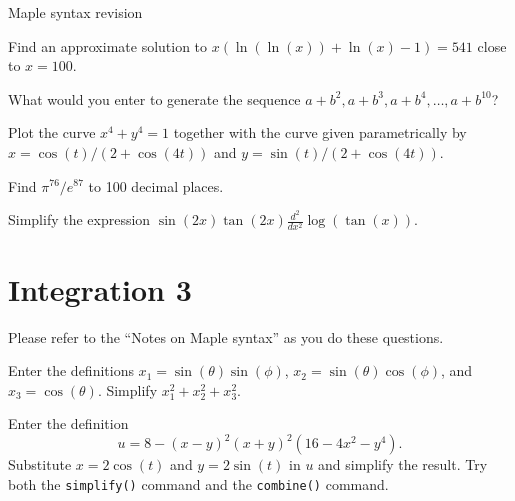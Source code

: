 \documentclass[a4paper,10pt]{amsbook}
\begin{document}
\begin{center}
 {\huge Maple syntax revision}
\end{center}

\begin{exercise}
 Find an approximate solution to
 $x(\ln(\ln(x))+\ln(x)-1)=541$ close to $x=100$. 
\end{exercise}

\begin{exercise}
 What would you enter to generate the sequence
 $a+b^2,a+b^3,a+b^4,\dotsc,a+b^{10}$? 
\end{exercise}


\begin{exercise}
 Plot the curve $x^4+y^4=1$ together with the curve given
 parametrically by $x=\cos(t)/(2+\cos(4t))$ and
 $y=\sin(t)/(2+\cos(4t))$. 
\end{exercise}

\begin{exercise}
 Find $\pi^{76}/e^{87}$ to 100 decimal places.
\end{exercise}

\begin{exercise}
 Simplify the expression
 $\displaystyle \sin(2x)\tan(2x)\frac{d^2}{dx^2}\log(\tan(x))$.
\end{exercise}


\chapter{Integration 3}

Please refer to the ``Notes on Maple syntax'' as you do
these questions.

\begin{exercise}
 Enter the definitions $x_1=\sin(\theta)\sin(\phi)$,
 $x_2=\sin(\theta)\cos(\phi)$, and $x_3=\cos(\theta)$.
 Simplify $x_1^2+x_2^2+x_3^2$.
\end{exercise}

\begin{exercise}
 Enter the definition
 \[ u = 8 - (x-y)^2 (x+y)^2 (16 - 4x^2 - y^4). \]
 Substitute $x=2\cos(t)$ and $y=2\sin(t)$ in $u$ and
 simplify the result.  Try both the \verb~simplify()~
 command and the \verb~combine()~ command.
\end{exercise}
\end{document}
